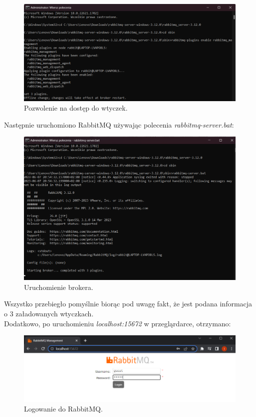 \documentclass[12pt,twoside]{article}
\begin{document}
\begin{figure}[!htb]
	\centering
	\includegraphics[width=1\textwidth]{figures/fig5.png}
	\caption{Pozwolenie na dostęp do wtyczek.}
	\label{fig:fig5}
\end{figure}
\clearpage

Następnie uruchomiono RabbitMQ używając polecenia \textit{rabbitmq-server.bat}:
\begin{figure}[!htb]
	\centering
	\includegraphics[width=1\textwidth]{figures/fig6.png}
	\caption{Uruchomienie brokera.}
	\label{fig:zdjecie}
\end{figure}

Wszystko przebiegło pomyślnie biorąc pod uwagę fakt, że jest podana informacja o 3 załadowanych wtyczkach.\\
Dodatkowo, po uruchomieniu \textit{localhost:15672} w przegląrdarce, otrzymano:
\begin{figure}[!htb]
	\centering
	\includegraphics[width=1\textwidth]{figures/fig7.png}
	\caption{Logowanie do RabbitMQ.}
	\label{fig:zdjecie}
\end{figure}
\clearpage
\end{document}
